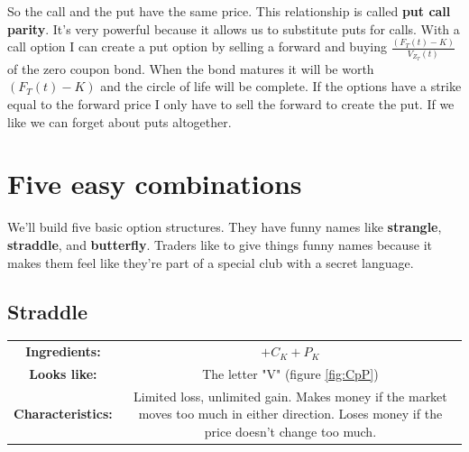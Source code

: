 

So the call and the put have the same price. This relationship is called \textbf{put call parity}. It's very powerful because it allows us to substitute puts for calls. With a call option I can create a put option by selling a forward and buying $\frac{(F_T(t)-K)}{V_{Z_T}(t)}$ of the zero coupon bond. When the bond matures it will be worth $(F_T(t)-K)$ and the circle of life will be complete. If the options have a strike equal to the forward price I only have to sell the forward to create the put. If we like we can forget about puts altogether. 



\section{Five easy combinations}

We'll build five basic option structures. They have funny names like \textbf{strangle}, \textbf{straddle}, and \textbf{butterfly}. Traders like to give things funny names because it makes them feel like they're part of a special club with a secret language. 


\subsection{Straddle}

\begin{center}
\begin{tabular}{|cc|}
\hline
\textbf{Ingredients:} & $+C_{K} +P_{K}$\\
\textbf{Looks like:}  &The letter "V" (figure \ref{fig:CpP})\\
\textbf{Characteristics:} & \parbox{3in}{Limited loss, unlimited gain. Makes money if the market moves too much in either direction. Loses money if the price doesn't change too much.}\\
\hline
\end{tabular}
\end{center}

